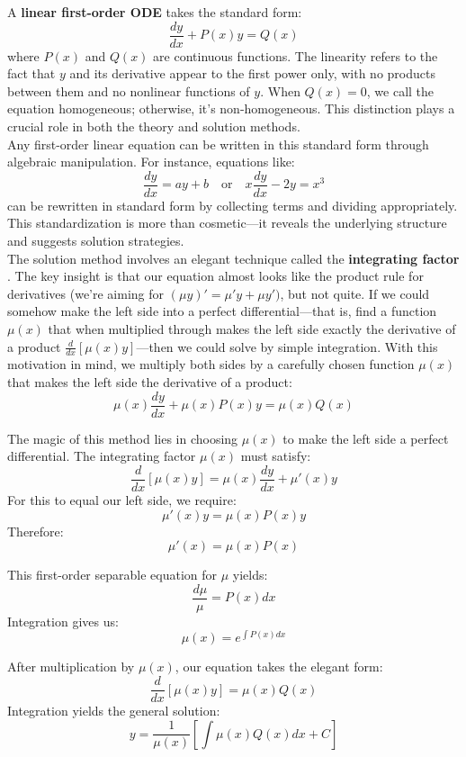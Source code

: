 \noindent A \textbf{linear first-order ODE} takes the standard form:
\[
\frac{dy}{dx} + P(x)y = Q(x)
\]
where $P(x)$ and $Q(x)$ are continuous functions. The linearity refers to the fact that $y$ and its derivative appear to the first power only, with no products between them and no nonlinear functions of $y$. When $Q(x) = 0$, we call the equation homogeneous; otherwise, it's non-homogeneous. This distinction plays a crucial role in both the theory and solution methods. \\

\noindent Any first-order linear equation can be written in this standard form through algebraic manipulation. For instance, equations like:
\[
\frac{dy}{dx} = ay + b \quad \text{or} \quad x\frac{dy}{dx} - 2y = x^3
\]
can be rewritten in standard form by collecting terms and dividing appropriately. This standardization is more than cosmetic—it reveals the underlying structure and suggests solution strategies. \\

\noindent The solution method involves an elegant technique called the \textbf{integrating factor} . The key insight is that our equation almost looks like the product rule for derivatives (we're aiming for $(\mu y)' = \mu'y + \mu y')$, but not quite. If we could somehow make the left side into a perfect differential—that is, find a function $\mu(x)$ that when multiplied through makes the left side exactly the derivative of a product $\frac{d}{dx}[\mu(x)y]$—then we could solve by simple integration. With this motivation in mind, we multiply both sides by a carefully chosen function $\mu(x)$ that makes the left side the derivative of a product:
\[
\mu(x)\frac{dy}{dx} + \mu(x)P(x)y = \mu(x)Q(x)
\]

\noindent The magic of this method lies in choosing $\mu(x)$ to make the left side a perfect differential. The integrating factor $\mu(x)$ must satisfy:
\[
\frac{d}{dx}[\mu(x)y] = \mu(x)\frac{dy}{dx} + \mu'(x)y
\]
For this to equal our left side, we require:
\[
\mu'(x)y = \mu(x)P(x)y
\]
Therefore:
\[
\mu'(x) = \mu(x)P(x)
\]

\noindent This first-order separable equation for $\mu$ yields:
\[
\frac{d\mu}{\mu} = P(x)dx
\]
Integration gives us:
\[
\mu(x) = e^{\int P(x)dx}
\]

\noindent After multiplication by $\mu(x)$, our equation takes the elegant form:
\[
\frac{d}{dx}[\mu(x)y] = \mu(x)Q(x)
\]
Integration yields the general solution:
\[
y = \frac{1}{\mu(x)}\left[\int \mu(x)Q(x)dx + C\right]
\]

